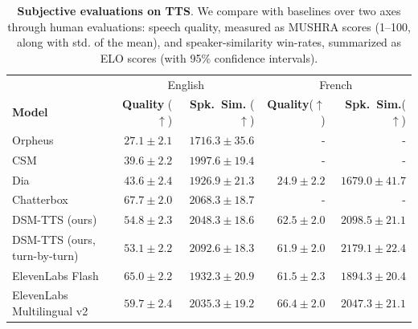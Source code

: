 \documentclass{article}
\begin{document}
\begin{table}[t]
\centering
\tiny
\caption{\textbf{Subjective evaluations on TTS}. We compare with baselines
over two axes through human evaluations: speech quality, measured as MUSHRA scores (1--100, along with std. of the mean), and speaker-similarity win-rates, summarized as ELO scores (with 95\% confidence intervals).}
\label{tab:subjective_tts}
\begin{sc}
\begin{tabular}{l|rr|rr}
\toprule
  &  \multicolumn{2}{c|}{English} &
    \multicolumn{2}{c}{French} \\
\textbf{Model} & \textbf{Quality} ($\uparrow$)  & \textbf{Spk.\ Sim.} ($\uparrow$)  & \textbf{Quality}($\uparrow$)  & \textbf{Spk.\ Sim.}($\uparrow$)  \\
\midrule
Orpheus & $27.1 \pm 2.1$ & $1716.3 \pm 35.6$ & - & -\\
CSM & $39.6 \pm 2.2$ & $1997.6 \pm 19.4$ & - & -\\
Dia & $43.6 \pm 2.4$ & $1926.9 \pm 21.3$ & $24.9 \pm 2.2$ & $1679.0 \pm 41.7$\\
Chatterbox & $\mathbf{67.7} \pm 2.0$ & $2068.3 \pm 18.7$ & - & -\\
DSM-TTS (ours) & $54.8 \pm 2.3$ & $2048.3 \pm 18.6$ & $62.5 \pm 2.0$ & $2098.5 \pm 21.1$\\
DSM-TTS (ours, turn-by-turn) & $53.1 \pm 2.2$ & $\mathbf{2092.6} \pm 18.3$ & $61.9 \pm 2.0$ & $\mathbf{2179.1} \pm 22.4$\\
ElevenLabs Flash & $65.0 \pm 2.2$ & $1932.3 \pm 20.9$ & $61.5 \pm 2.3$ & $1894.3 \pm 20.4$\\
ElevenLabs Multilingual v2 & $59.7 \pm 2.4$ & $2035.3 \pm 19.2$ & $\mathbf{66.4} \pm 2.0$ & $2047.3 \pm 21.1$\\


\bottomrule
\end{tabular}
\end{sc}
\end{table}
\end{document}
